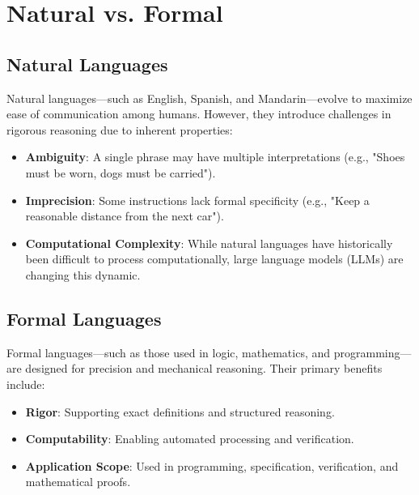 \documentclass{book}
\providecommand{\tightlist}{%
  \setlength{\itemsep}{0pt}\setlength{\parskip}{0pt}}
\begin{document}
\hypertarget{book__pandoc__debug__src__languages.md__natural-vs-formal}{%
\section*{Natural vs. Formal}\label{book__pandoc__debug__src__languages.md__natural-vs-formal}}

\hypertarget{book__pandoc__debug__src__languages.md__natural-languages}{%
\subsection*{Natural Languages}\label{book__pandoc__debug__src__languages.md__natural-languages}}

Natural languages---such as English, Spanish, and Mandarin---evolve to maximize ease of communication among humans. However, they introduce challenges in rigorous reasoning due to inherent properties:

\begin{itemize}
\tightlist
\item
  \textbf{Ambiguity}: A single phrase may have multiple interpretations (e.g., "Shoes must be worn, dogs must be carried").
\item
  \textbf{Imprecision}: Some instructions lack formal specificity (e.g., "Keep a reasonable distance from the next car").
\item
  \textbf{Computational Complexity}: While natural languages have historically been difficult to process computationally, large language models (LLMs) are changing this dynamic.
\end{itemize}

\hypertarget{book__pandoc__debug__src__languages.md__formal-languages}{%
\subsection*{Formal Languages}\label{book__pandoc__debug__src__languages.md__formal-languages}}

Formal languages---such as those used in logic, mathematics, and programming---are designed for precision and mechanical reasoning. Their primary benefits include:

\begin{itemize}
\tightlist
\item
  \textbf{Rigor}: Supporting exact definitions and structured reasoning.
\item
  \textbf{Computability}: Enabling automated processing and verification.
\item
  \textbf{Application Scope}: Used in programming, specification, verification, and mathematical proofs.
\end{itemize}
\end{document}
